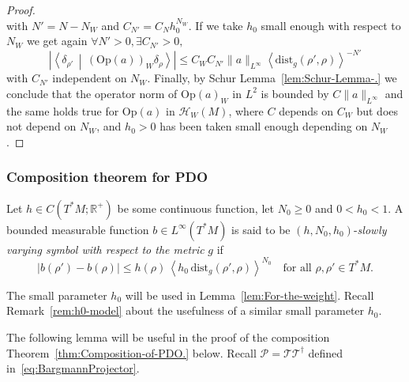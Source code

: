 \documentclass[AHL,Unicode,longabstracts,published]{cedram}
\newcommand{\clT}{\mathcal{T}}
\newcommand{\clH}{\mathcal{H}}
\newcommand{\clP}{\mathcal{P}}
\newcommand{\dist}{\mathrm{dist}}
\newcommand{\Opp}{\mathrm{Op}}
\newcommand{\bbR}{\mathbb{R}}
\let\oldexists\exists
\renewcommand*{\exists}{\mathrel{\oldexists}}
\let\oldforall\forall
\renewcommand*{\forall}{\mathrel{\oldforall}}
\newcommand{\clH}{\mathcal{H}}
\newcommand{\bbR}{\mathbb{R}}
\begin{document}
\begin{proof}
\begin{equation}
\end{equation}
with $N'=N-N_{W}$ and $C_{N'}=C_{N}h_{0}^{N_{W}}$. If we take $h_{0}$ small enough with respect to $N_{W}$ we get again $\forall N'>0,\exists C_{N'}>0,$
\[
\left|\left\langle\delta_{\rho'}\,\middle|\,\left(\Opp \left(a\right)\right)_{W}\delta_{\rho}\right\rangle\right|\leq C_{W}C_{N'}\|a\|_{L^{\infty}}\left\langle \dist_{g}\left(\rho',\rho\right)\right\rangle ^{-N'}
\]
with $C_{N'}$ independent on $N_{W}$. Finally, by Schur Lemma~\ref{lem:Schur-Lemma-.} we conclude that the operator norm of $\Opp (a)_{W}$ in $L^{2}$ is bounded by $C\|a\|_{L^{\infty}}$ and the same holds true for $\Opp (a)$ in $\clH _{W}(M)$, where $C$ depends on $C_{W}$ but does not depend on $N_{W}$, and $h_{0}>0$ has been taken small enough depending on $N_{W}$.
\end{proof}

\subsubsection{Composition theorem for PDO}

\begin{cBoxA}{}
\begin{defi}\label{def:Let--be}
Let $h\in C(T^{*}M;\bbR^{+})$ be some continuous function, let $N_{0}\geq0$ and $0<h_{0}<1$. A bounded measurable function $b\in L^{\infty}(T^{*}M)$ is said to be $(h,N_{0},h_{0})$-\emph{slowly varying symbol with respect to the metric} $g$ if
\begin{equation}\label{eq:slow_variations}
\left|b\left(\rho'\right)-b\left(\rho\right)\right|\leq h\left(\rho\right)\,\left\langle h_{0}\,\dist_{g}\left(\rho',\rho\right)\right\rangle ^{N_{0}}\quad\text{for all }\rho,\rho'\in T^{*}M.
\end{equation}
\end{defi}
\end{cBoxA}

\begin{rema}
The small parameter $h_{0}$ will be used in Lemma~\ref{lem:For-the-weight}. Recall Remark~\ref{rem:h0-model} about the usefulness of a similar small parameter $h_{0}$.
\end{rema}

The following lemma will be useful in the proof of the composition Theorem~\ref{thm:Composition-of-PDO.} below. Recall $\clP =\clT\clT^{\dagger}$ defined in~\eqref{eq:BargmannProjector}.
\end{document}
